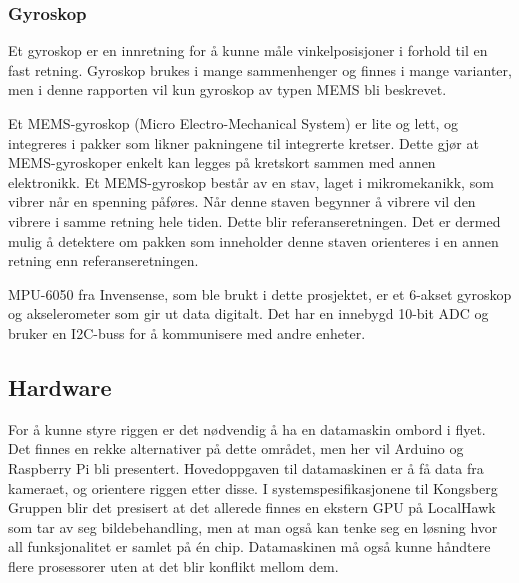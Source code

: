 \subsubsection{Gyroskop}

Et gyroskop er en innretning for å kunne måle vinkelposisjoner i forhold til en fast retning. Gyroskop brukes i mange sammenhenger og finnes i mange varianter, men i denne rapporten vil kun gyroskop av typen MEMS bli beskrevet. 

Et MEMS-gyroskop (Micro Electro-Mechanical System) er lite og lett, og integreres i pakker som likner pakningene til integrerte kretser. Dette gjør at MEMS-gyroskoper enkelt kan legges på kretskort sammen med annen elektronikk. Et MEMS-gyroskop består av en stav, laget i mikromekanikk, som vibrer når en spenning påføres. Når denne staven begynner å vibrere vil den vibrere i samme retning hele tiden. Dette blir referanseretningen. Det er dermed mulig å detektere om pakken som inneholder denne staven orienteres i en annen retning enn referanseretningen.

MPU-6050 fra Invensense, som ble brukt i dette prosjektet, er et 6-akset gyroskop og akselerometer som gir ut data digitalt. Det har en innebygd 10-bit ADC og bruker en I2C-buss for å kommunisere med andre enheter.\cite{InSens}

\subsection{Hardware}
For å kunne styre riggen er det nødvendig å ha en datamaskin ombord i flyet. Det finnes en rekke alternativer på dette området, men her vil Arduino og Raspberry Pi bli presentert. Hovedoppgaven til datamaskinen er å få data fra kameraet, og orientere riggen etter disse. I systemspesifikasjonene til Kongsberg Gruppen blir det presisert at det allerede finnes en ekstern GPU på LocalHawk som tar av seg bildebehandling, men at man også kan tenke seg en løsning hvor all funksjonalitet er samlet på én chip. Datamaskinen må også kunne håndtere flere prosessorer uten at det blir konflikt mellom dem.

